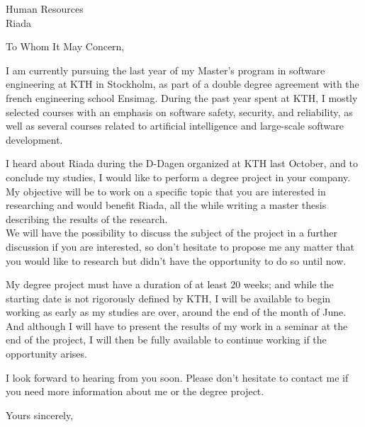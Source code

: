 \documentclass[a4paper,
    DINmtext,
    version=last,
    parskip=full,
    foldmarks=false,
    fromrule,
    enlargefirstpage,
    firstfoot=false,
    fromphone, fromlogo, fromemail, fromurl,
    addrfield=topaligned, backaddress=false]
{scrlttr2}
\newcommand{\company}{Riada}
\newcommand{\contactFirstName}{Human}
\newcommand{\contactLastName}{Resources}
\newcommand{\contactSirOrMadam}{~}
\begin{document}
\begin{letter}{
    \vspace{3cm} \contactFirstName{} \contactLastName{} \\ \company{}
}
\opening{To Whom It May Concern,}
I am currently pursuing the last year of my Master's program
in software engineering at KTH in Stockholm,
as part of a double degree agreement with the french engineering school Ensimag.
During the past year spent at KTH, I mostly selected courses with an emphasis
on software safety, security, and reliability, as well as several courses
related to artificial intelligence and large-scale software development.

I heard about \company{} during the D-Dagen organized at KTH last October,
and to conclude my studies, I would like to perform a degree project in your company.
My objective will be to work on a specific topic that you are interested in researching
and would benefit \company{}, all the while writing a master thesis
describing the results of the research. \\
We will have the possibility to discuss the subject of the project
in a further discussion if you are interested,
so don't hesitate to propose me any matter that you would like to research
but didn't have the opportunity to do so until now.

My degree project must have a duration of at least 20 weeks;
and while the starting date is not rigorously defined by KTH,
I will be available to begin working as early as my studies are over,
around the end of the month of June. \\
And although I will have to present the results of my work in a seminar
at the end of the project, I will then be fully available to continue working
if the opportunity arises.

I look forward to hearing from you soon.
Please don't hesitate to contact me if you need more information
about me or the degree project.

\closing{Yours sincerely,}
\end{letter}
\end{document}

